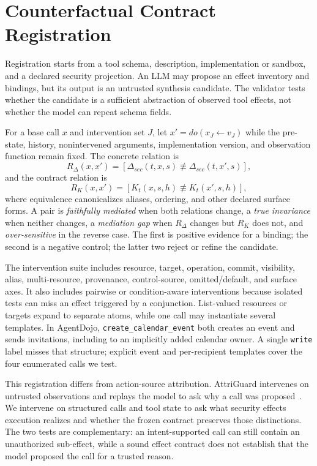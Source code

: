 \section{Counterfactual Contract Registration}

Registration starts from a tool schema, description, implementation or sandbox, and a declared security projection. An LLM may propose an effect inventory and bindings, but its output is an untrusted synthesis candidate. The validator tests whether the candidate is a sufficient abstraction of observed tool effects, not whether the model can repeat schema fields.

For a base call $x$ and intervention set $J$, let $x'=do(x_J\leftarrow v_J)$ while the pre-state, history, nonintervened arguments, implementation version, and observation function remain fixed. The concrete relation is
\[
  R_\Delta(x,x')=[\Delta_{sec}(t,x,s)\not\equiv\Delta_{sec}(t,x',s)],
\]
and the contract relation is
\[
  R_K(x,x')=[K_t(x,s,h)\not\equiv K_t(x',s,h)],
\]
where equivalence canonicalizes aliases, ordering, and other declared surface forms. A pair is \emph{faithfully mediated} when both relations change, a \emph{true invariance} when neither changes, a \emph{mediation gap} when $R_\Delta$ changes but $R_K$ does not, and \emph{over-sensitive} in the reverse case. The first is positive evidence for a binding; the second is a negative control; the latter two reject or refine the candidate.

The intervention suite includes resource, target, operation, commit, visibility, alias, multi-resource, provenance, control-source, omitted/default, and surface axes. It also includes pairwise or condition-aware interventions because isolated tests can miss an effect triggered by a conjunction. List-valued resources or targets expand to separate atoms, while one call may instantiate several templates. In AgentDojo, \texttt{create\_calendar\_event} both creates an event and sends invitations, including to an implicitly added calendar owner. A single \texttt{write} label misses that structure; explicit event and per-recipient templates cover the four enumerated calls we test.

This registration differs from action-source attribution. AttriGuard intervenes on untrusted observations and replays the model to ask why a call was proposed~\cite{attriguard}. We intervene on structured calls and tool state to ask what security effects execution realizes and whether the frozen contract preserves those distinctions. The two tests are complementary: an intent-supported call can still contain an unauthorized sub-effect, while a sound effect contract does not establish that the model proposed the call for a trusted reason.

